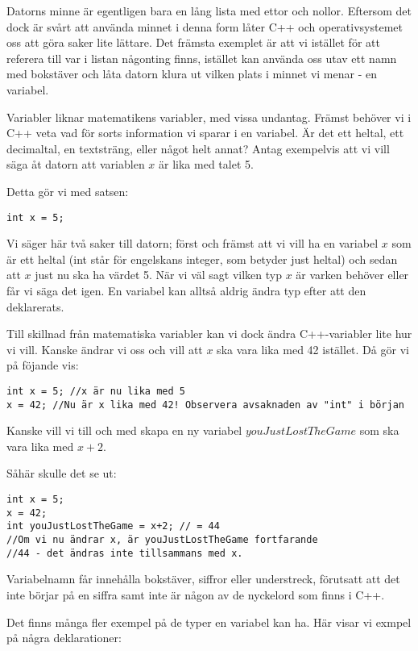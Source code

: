 Datorns minne är egentligen bara en lång lista med ettor och nollor. Eftersom det dock är svårt att använda minnet i denna form låter C++ och operativsystemet oss att göra saker lite lättare. Det främsta exemplet är att vi istället för att referera till var i listan någonting finns, istället kan använda oss utav ett namn med bokstäver och låta datorn klura ut vilken plats i minnet vi menar - en variabel.

Variabler liknar matematikens variabler, med vissa undantag. Främst behöver vi i C++ veta vad för sorts information vi sparar i en variabel. Är det ett heltal, ett decimaltal, en textsträng, eller något helt annat? Antag exempelvis att vi vill säga åt datorn att variablen $x$ är lika med talet 5.

Detta gör vi med satsen:
\begin{lstlisting}
int x = 5;
\end{lstlisting}

Vi säger här två saker till datorn; först och främst att vi vill ha en variabel $x$ som är ett heltal (int står för engelskans integer, som betyder just heltal) och sedan att $x$ just nu ska ha värdet 5. När vi väl sagt vilken typ $x$ är varken behöver eller får vi säga det igen. En variabel kan alltså aldrig ändra typ efter att den deklarerats.

Till skillnad från matematiska variabler kan vi dock ändra C++-variabler lite hur vi vill. Kanske ändrar vi oss och vill att $x$ ska vara lika med 42 istället. Då gör vi på föjande vis:

\begin{lstlisting}
int x = 5; //x är nu lika med 5
x = 42; //Nu är x lika med 42! Observera avsaknaden av "int" i början
\end{lstlisting}

Kanske vill vi till och med skapa en ny variabel $youJustLostTheGame$ som ska vara lika med $x+2$.

Såhär skulle det se ut:

\begin{lstlisting}
int x = 5;
x = 42;
int youJustLostTheGame = x+2; // = 44
//Om vi nu ändrar x, är youJustLostTheGame fortfarande
//44 - det ändras inte tillsammans med x.
\end{lstlisting}

Variabelnamn får innehålla bokstäver, siffror eller understreck, förutsatt att det inte börjar på en siffra samt inte är någon av de nyckelord som finns i C++.

Det finns många fler exempel på de typer en variabel kan ha. Här visar vi exmpel på några deklarationer:


